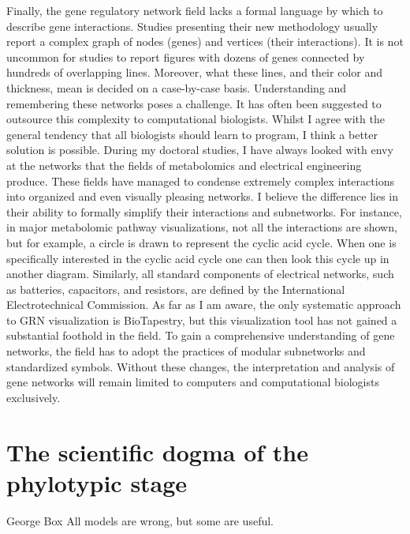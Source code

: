 Finally, the gene regulatory network field lacks a formal language by which to describe gene interactions\cite{Lazebnik2002}. Studies presenting their new methodology usually report a complex graph of nodes (genes) and vertices (their interactions)\cite{Xu_2020,Aibar_2017,Margolin_2006,Glass_2013,Chan_2017,Jiang_2021,Kamimoto_2020,Woodhouse_2018,Rubiolo_2017}. It is not uncommon for studies to report figures with dozens of genes connected by hundreds of overlapping lines. Moreover, what these lines, and their color and thickness, mean is decided on a case-by-case basis. Understanding and remembering these networks poses a challenge. It has often been suggested to outsource this complexity to computational biologists\cite{Lazebnik2002,Bray2001,Markowetz2017}. Whilst I agree with the general tendency that all biologists should learn to program, I think a better solution is possible. During my doctoral studies, I have always looked with envy at the networks that the fields of metabolomics and electrical engineering produce. These fields have managed to condense extremely complex interactions into organized and even visually pleasing networks. I believe the difference lies in their ability to formally simplify their interactions and subnetworks. For instance, in major metabolomic pathway visualizations, not all the interactions are shown, but for example, a circle is drawn to represent the cyclic acid cycle. When one is specifically interested in the cyclic acid cycle one can then look this cycle up in another diagram. Similarly, all standard components of electrical networks, such as batteries, capacitors, and resistors, are defined by the International Electrotechnical Commission\cite{IEC}. As far as I am aware, the only systematic approach to GRN visualization is BioTapestry\cite{Longabaugh2011}, but this visualization tool has not gained a substantial foothold in the field. To gain a comprehensive understanding of gene networks, the field has to adopt the practices of modular subnetworks and standardized symbols. Without these changes, the interpretation and analysis of gene networks will remain limited to computers and computational biologists exclusively.

\section{The scientific dogma of the phylotypic stage}

\begin{shadequote}[c]{George Box}
All models are wrong, but some are useful.
\end{shadequote}


